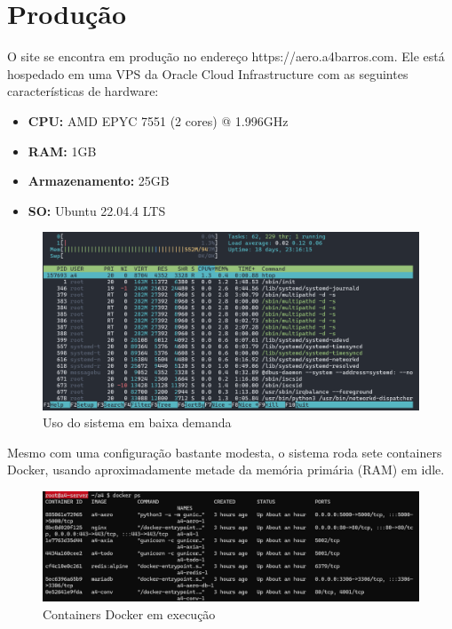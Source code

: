 \section{Produção}
O site se encontra em produção no endereço https://aero.a4barros.com. Ele está hospedado em uma VPS
da Oracle Cloud Infrastructure com as seguintes características de hardware:

\begin{itemize}
    \item \textbf{CPU:} AMD EPYC 7551 (2 cores) @ 1.996GHz
    \item \textbf{RAM:} 1GB
    \item \textbf{Armazenamento:} 25GB
    \item \textbf{SO:} Ubuntu 22.04.4 LTS
\end{itemize}

\begin{figure}[ht]
    \begin{center}
    \includegraphics[width=400pt]{img/prod-idle.png}
    \caption{Uso do sistema em baixa demanda}
    \label{fig:prod-idle}
    \end{center}
\end{figure}

Mesmo com uma configuração bastante modesta, o sistema roda sete containers Docker, usando 
aproximadamente metade da memória primária (RAM) em idle.

\begin{figure}[ht]
    \begin{center}
    \includegraphics[width=400pt]{img/containers.png}
    \caption{Containers Docker em execução}
    \label{fig:containers}
    \end{center}
\end{figure}

